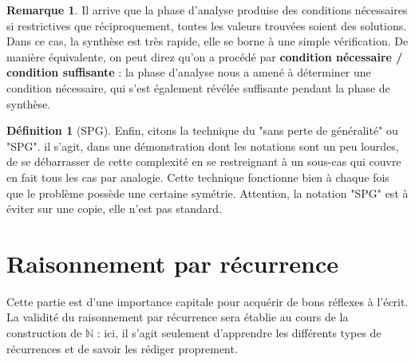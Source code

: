 \documentclass[french]{book}
\newcommand{\N}{\mathbb{N}}
\theoremstyle{plain}
\theoremstyle{definition}
\newtheorem{dfn}{Définition}[chapter]
\newtheorem{rmq}{Remarque}[chapter]
\theoremstyle{remark}
\begin{document}
\begin{rmq}
	Il arrive que la phase d'analyse produise des conditions nécessaires si restrictives que réciproquement, toutes les valeurs trouvées soient des solutions. Dans ce cas, la synthèse est très rapide, elle se borne à une simple vérification. De manière équivalente, on peut direz qu'on a procédé par \textbf{condition nécessaire / condition suffisante} :  la phase d'analyse nous a amené à déterminer une condition nécessaire, qui s'est également révélée suffisante pendant la phase de synthèse.
\end{rmq}
\begin{dfn}[SPG]
	Enfin, citons la technique du "sans perte de généralité" ou "SPG". il s'agit, dans une démonstration dont les notations sont un peu lourdes, de se débarrasser de cette complexité en se restreignant à un sous-cas qui couvre en fait tous les cas par analogie. Cette technique fonctionne bien à chaque fois que le problème possède une certaine symétrie. Attention, la notation "SPG" est à éviter sur une copie, elle n'est pas standard.
\end{dfn}
\section{Raisonnement par récurrence}
Cette partie est d'une importance capitale pour acquérir de bons réflexes à l'écrit. La validité du raisonnement par récurrence sera établie au cours de la construction de $\N$ : ici, il s'agit seulement d'apprendre les différents types de récurrences et de savoir les rédiger proprement.
\end{document}
